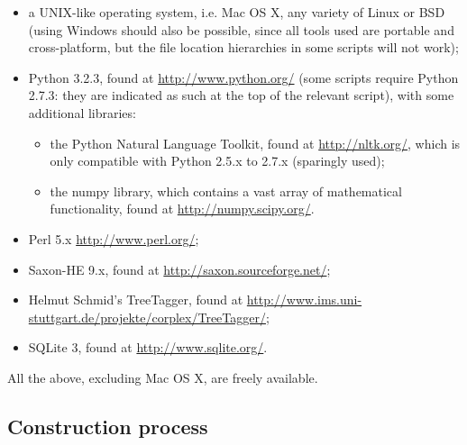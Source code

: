 \begin{itemize}

  \item a UNIX-like operating system, i.e. Mac OS X, any variety of Linux or
    BSD (using Windows should also be possible, since all tools used are
    portable and cross-platform, but the file location hierarchies in some
    scripts will not work);

  \item Python 3.2.3, found at \url{http://www.python.org/} (some scripts
    require Python 2.7.3: they are indicated as such at the top of the relevant
    script), with some additional libraries:

    \begin{itemize}

      \item the Python Natural Language Toolkit, found at
        \url{http://nltk.org/}, which is only compatible with Python 2.5.x to
        2.7.x (sparingly used);

      \item the numpy library, which contains a vast array of mathematical
        functionality, found at \url{http://numpy.scipy.org/}.

    \end{itemize}

  \item Perl 5.x \url{http://www.perl.org/};

  \item Saxon-HE 9.x, found at \url{http://saxon.sourceforge.net/};

  \item Helmut Schmid's TreeTagger, found at
    \url{http://www.ims.uni-stuttgart.de/projekte/corplex/TreeTagger/};

  \item SQLite 3, found at \url{http://www.sqlite.org/}.

\end{itemize}

All the above, excluding Mac OS X, are freely available.



\subsection{Construction process} %
\label{sub:principles-nlp}

